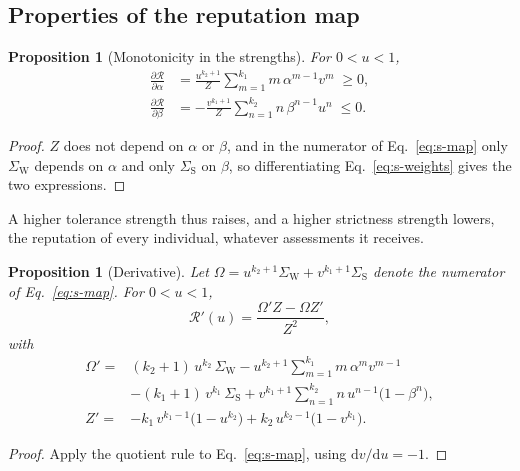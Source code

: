 \documentclass[10pt]{wlscirep}
\newcommand{\Rmap}{\mathscr{R}}            %
\newcommand{\dd}{\mathrm{d}}
\theoremstyle{plain}
\newtheorem{proposition}[lemma]{Proposition}
\theoremstyle{remark}
\begin{document}
\subsection{Properties of the reputation map}

\begin{proposition}[Monotonicity in the strengths]\label{prop:monotone}
For $0<u<1$,
\begin{equation}
\begin{aligned}
\frac{\partial\Rmap}{\partial\alpha}&=\frac{u^{k_2+1}}{Z}\sum_{m=1}^{k_1}m\,\alpha^{m-1}v^m\;\geq0,\\[2pt]
\frac{\partial\Rmap}{\partial\beta}&=-\frac{v^{k_1+1}}{Z}\sum_{n=1}^{k_2}n\,\beta^{n-1}u^n\;\leq0.
\end{aligned}
\label{eq:s-monotonicity}
\end{equation}
\end{proposition}
\begin{proof}
$Z$ does not depend on $\alpha$ or $\beta$, and in the numerator of Eq.~\eqref{eq:s-map} only $\Sigma_{\mathrm W}$ depends on $\alpha$ and only $\Sigma_{\mathrm S}$ on $\beta$, so differentiating Eq.~\eqref{eq:s-weights} gives the two expressions.
\end{proof}

A higher tolerance strength thus raises, and a higher strictness strength lowers, the reputation of every individual, whatever assessments it receives.

\begin{proposition}[Derivative]\label{prop:derivative}
Let $\Omega=u^{k_2+1}\Sigma_{\mathrm W}+v^{k_1+1}\Sigma_{\mathrm S}$ denote the numerator of Eq.~\eqref{eq:s-map}. For $0<u<1$,
\begin{equation}
\Rmap'(u)=\frac{\Omega'Z-\Omega Z'}{Z^2},
\label{eq:s-derivative}
\end{equation}
with
\begin{equation}
\begin{aligned}
\Omega'={}&(k_2+1)\,u^{k_2}\,\Sigma_{\mathrm W}-u^{k_2+1}\sum_{m=1}^{k_1}m\,\alpha^m v^{m-1}\\
&-(k_1+1)\,v^{k_1}\,\Sigma_{\mathrm S}+v^{k_1+1}\sum_{n=1}^{k_2}n\,u^{n-1}\bigl(1-\beta^n\bigr),\\[2pt]
Z'={}&-k_1\,v^{k_1-1}\bigl(1-u^{k_2}\bigr)+k_2\,u^{k_2-1}\bigl(1-v^{k_1}\bigr).
\end{aligned}
\label{eq:s-derivative-parts}
\end{equation}
\end{proposition}
\begin{proof}
Apply the quotient rule to Eq.~\eqref{eq:s-map}, using $\dd v/\dd u=-1$.
\end{proof}
\end{document}
